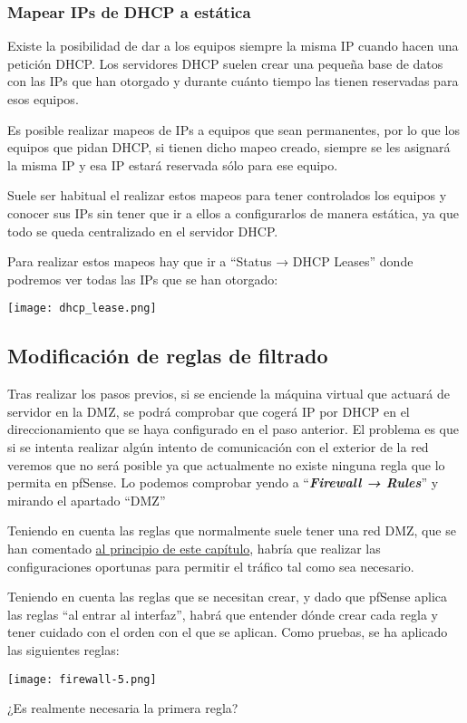 \subsubsection{Mapear IPs de DHCP a estática}
Existe la posibilidad de dar a los equipos siempre la misma IP cuando hacen una petición DHCP. Los servidores DHCP suelen crear una pequeña base de datos con las IPs que han otorgado y durante cuánto tiempo las tienen reservadas para esos equipos.

Es posible realizar mapeos de IPs a equipos que sean permanentes, por lo que los equipos que pidan DHCP, si tienen dicho mapeo creado, siempre se les asignará la misma IP y esa IP estará reservada sólo para ese equipo.

Suele ser habitual el realizar estos mapeos para tener controlados los equipos y conocer sus IPs sin tener que ir a ellos a configurarlos de manera estática, ya que todo se queda centralizado en el servidor DHCP.

Para realizar estos mapeos hay que ir a “Status → DHCP Leases” donde podremos ver todas las IPs que se han otorgado:

\begin{center}
    \vspace{-10pt}
    \texttt{[image: dhcp\_lease.png]}
    \vspace{-20pt}
\end{center}


\subsection{Modificación de reglas de filtrado}
Tras realizar los pasos previos, si se enciende la máquina virtual que actuará de servidor en la DMZ, se podrá comprobar que cogerá IP por DHCP en el direccionamiento que se haya configurado en el paso anterior. El problema es que si se intenta realizar algún intento de comunicación con el exterior de la red veremos que no será posible ya que actualmente no existe ninguna regla que lo permita en pfSense. Lo podemos comprobar yendo a “\textit{\textbf{Firewall → Rules}}” y mirando el apartado “DMZ”


Teniendo en cuenta las reglas que normalmente suele tener una red DMZ, que se han comentado \href{crear_una_nueva_red}{al principio de este capítulo}, habría que realizar las configuraciones oportunas para permitir el tráfico tal como sea necesario.

Teniendo en cuenta las reglas que se necesitan crear, y dado que pfSense aplica las reglas “al entrar al interfaz”, habrá que entender dónde crear cada regla y tener cuidado con el orden con el que se aplican. Como pruebas, se ha aplicado las siguientes reglas:

\begin{center}
    \vspace{-15pt}
    \texttt{[image: firewall-5.png]}
    \vspace{-20pt}
\end{center}

¿Es realmente necesaria la primera regla?
